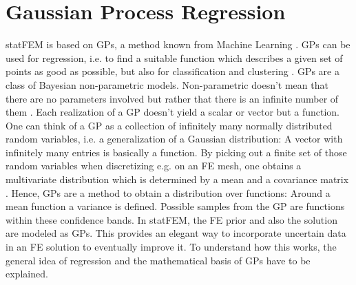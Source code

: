 \documentclass[%
  a4paper,oneside,%
  11pt,%
  smallchapters,
  style=printdev,
  extramargin,
  green,%
  rgb, <cmyk>
  ]{tubsbook}
\begin{document}
\section{Gaussian Process Regression}
statFEM is based on GPs, a method known from Machine Learning \cite{murphy2012}. GPs can be used for regression, i.e. to find a suitable function which describes a given set of points as good as possible, but also for classification and clustering \cite{gortler2019} . 
GPs are a class of Bayesian non-parametric models. Non-parametric doesn't mean that there are no parameters involved but rather that there is an infinite number of them \cite{gortler2019}. Each realization of a GP doesn't yield a scalar or vector but a function. One can think of a GP as a collection of infinitely many normally distributed random variables, i.e. a generalization of a Gaussian distribution: A vector with infinitely many entries is basically a function. By picking out a finite set of those random variables when discretizing e.g. on an FE mesh, one obtains a multivariate distribution which is determined by a mean and a covariance matrix \cite[p. 2]{rasmussen2006}. Hence, GPs are a method to obtain a distribution over functions: Around a mean function a variance is defined. Possible samples from the GP are functions within these confidence bands. In statFEM, the FE prior and also the solution are modeled as GPs. This provides an elegant way to incorporate uncertain data in an FE solution to eventually improve it. To understand how this works, the general idea of regression and the mathematical basis of GPs have to be explained.
\end{document}
